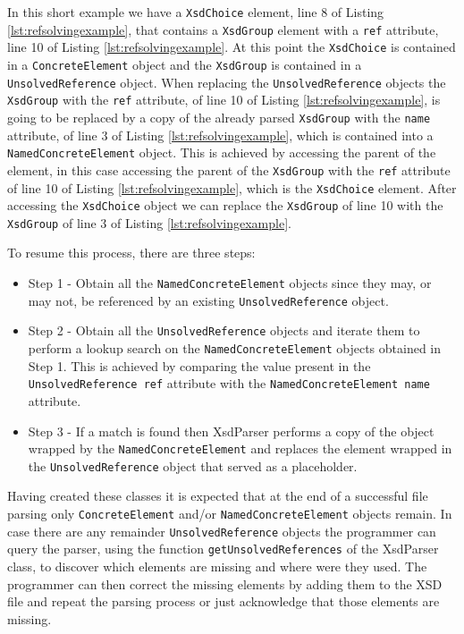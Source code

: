 \noindent
In this short example we have a \texttt{XsdChoice} element, line 8 of Listing \ref{lst:refsolvingexample}, that contains a \texttt{XsdGroup} element with a \texttt{ref} attribute, line 10 of Listing \ref{lst:refsolvingexample}. At this point the \texttt{XsdChoice} is contained in a \texttt{ConcreteElement} object and the \texttt{XsdGroup} is contained in a \texttt{UnsolvedReference} object. When replacing the \texttt{UnsolvedReference} objects the \texttt{XsdGroup} with the \texttt{ref} attribute, of line 10 of Listing \ref{lst:refsolvingexample}, is going to be replaced by a copy of the already parsed \texttt{XsdGroup} with the \texttt{name} attribute, of line 3 of Listing \ref{lst:refsolvingexample}, which is contained into a \texttt{NamedConcreteElement} object. This is achieved by accessing the parent of the element, in this case accessing the parent of the \texttt{XsdGroup} with the \texttt{ref} attribute of line 10 of Listing \ref{lst:refsolvingexample}, which is the \texttt{XsdChoice} element. After accessing the \texttt{XsdChoice} object we can replace the \texttt{XsdGroup} of line 10 with the \texttt{XsdGroup} of line 3 of Listing \ref{lst:refsolvingexample}.

\noindent
To resume this process, there are three steps:

\begin{itemize}
	\item Step 1 - Obtain all the \texttt{NamedConcreteElement} objects since they may, or may not, be referenced by an existing \texttt{UnsolvedReference} object.
	\item Step 2 - Obtain all the \texttt{UnsolvedReference} objects and iterate them to perform a lookup search on the \texttt{NamedConcreteElement} objects obtained in Step 1. This is achieved by comparing the value present in the \texttt{UnsolvedReference ref} attribute with the \texttt{NamedConcreteElement name} attribute.
	\item Step 3 - If a match is found then XsdParser performs a copy of the object wrapped by the \texttt{NamedConcreteElement} and replaces the element wrapped in the \texttt{UnsolvedReference} object that served as a placeholder.
\end{itemize}

\noindent
Having created these classes it is expected that at the end of a successful file parsing only \texttt{ConcreteElement} and/or \texttt{NamedConcreteElement} objects remain. In case there are any remainder \texttt{UnsolvedReference} objects the programmer can query the parser, using the function \texttt{getUnsolvedReferences} of the XsdParser class, to discover which elements are missing and where were they used. The programmer can then correct the missing elements by adding them to the \ac{XSD} file and repeat the parsing process or just acknowledge that those elements are missing. 

